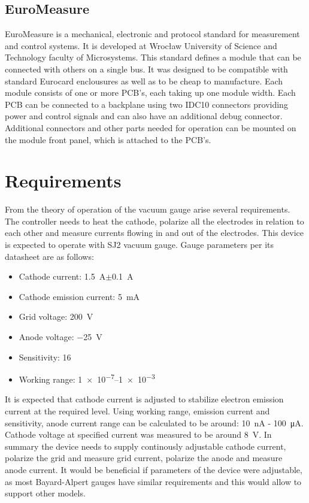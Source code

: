 \documentclass{article}
\begin{document}
\subsection{EuroMeasure}
EuroMeasure is a mechanical, electronic and protocol standard for measurement and control systems.
It is developed at Wrocław University of Science and Technology faculty of Microsystems. This standard defines a module that can be connected with others on a single bus.
It was designed to be compatible with standard Eurocard enclousures as well as to be cheap to manufacture.
Each module consists of one or more PCB's, each taking up one module width. Each PCB can be connected to a backplane using two IDC10 connectors providing power and control signals and can also have an additional debug connector.
Additional connectors and other parts needed for operation can be mounted on the module front panel, which is attached to the PCB's.

\section{Requirements}
From the theory of operation of the vacuum gauge arise several requirements. The controller needs to heat the cathode, polarize all the electrodes in relation to each other and measure currents flowing in and out of the electrodes.
This device is expected to operate with SJ2 vacuum gauge. Gauge parameters per its datasheet are as follows:
\begin{itemize}
	\item Cathode current: \SI{1.5}{\ampere}$\pm$\SI{0.1}{\ampere}
	\item Cathode emission current: \SI{5}{\milli\ampere}
	\item Grid voltage: \SI{200}{\volt}
	\item Anode voltage: \SI{-25}{\volt}
	\item Sensitivity: \SI{16}{\frac{\milli\ampere}{\milli\ampere\cdot\torr}}
	\item Working range: \SIrange{1e-7}{1e-3}{\torr}
\end{itemize}

It is expected that cathode current is adjusted to stabilize electron emission current at the required level.
Using working range, emission current and sensitivity, anode current range can be calculated to be around: \SI{10}{\nano\ampere} - \SI{100}{\micro\ampere}.
Cathode voltage at specified current was measured to be around \SI{8}{\volt}.
In summary the device needs to supply continously adjustable cathode current, polarize the grid and measure grid current, polarize the anode and measure anode current.
It would be beneficial if parameters of the device were adjustable, as most Bayard-Alpert gauges have similar requirements and this would allow to support other models.
\end{document}
